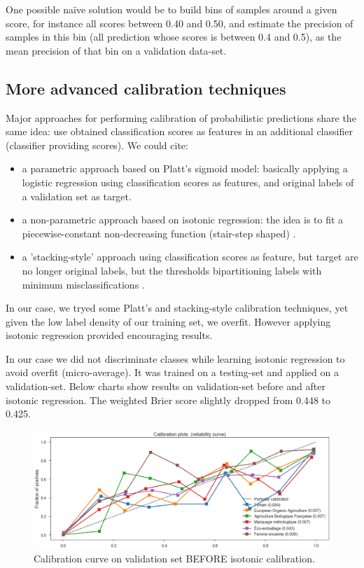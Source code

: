 One possible naïve solution would be to build bins of samples around a given score, for instance all scores between 0.40 and 0.50, and estimate the precision of samples in this bin (all prediction whose scores is between 0.4 and 0.5), as the mean precision of that bin on a validation data-set.

\subsection{More advanced calibration techniques}

Major approaches for performing calibration of probabilistic predictions share the same idea: use obtained classification scores as features in an additional classifier (classifier providing scores). We could cite: 
\begin{itemize}
	\item a parametric approach based on Platt’s sigmoid model: basically applying a logistic regression using classification scores as features, and original labels of a validation set as target.
	\item a non-parametric approach based on isotonic regression: the idea is to fit a piecewise-constant non-decreasing function (stair-step shaped) \cite{Calibration}.
	\item a 'stacking-style' approach using classification scores as feature, but target are no longer original labels, but the thresholds bipartitioning labels with minimum misclassifications \cite{MultilabelReview}.
\end{itemize}

In our case, we tryed some Platt's and stacking-style calibration techniques, yet given the low label density of our training set, we overfit. However applying isotonic regression provided encouraging results. 

In our case we did not discriminate classes while learning isotonic regression to avoid overfit (micro-average). It was trained on a testing-set and applied on a validation-set. Below charts show results on validation-set before and after isotonic regression. The weighted Brier score slightly dropped from 0.448 to 0.425.

\begin{figure}[H]
\centering
\includegraphics[scale=0.40]{./images/calibration/calibration_val_before.png}
\caption{Calibration curve on validation set BEFORE isotonic calibration.}
\end{figure}

